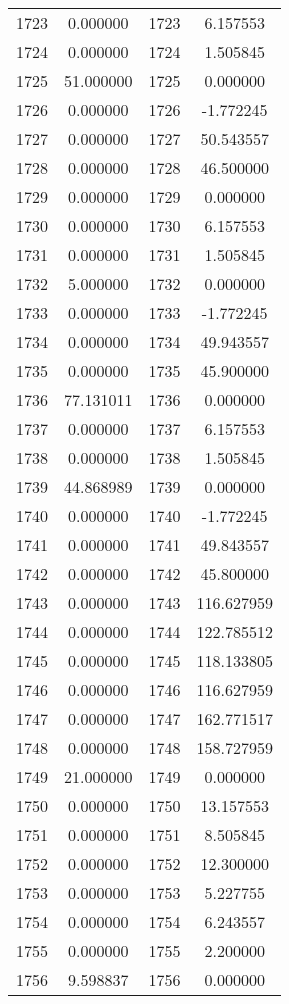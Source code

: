 \documentclass[12pt]{article}
\begin{document}
\begin{longtable}{@{}cccc@{}}
1723 & 0.000000 & 1723 & 6.157553 \\
1724 & 0.000000 & 1724 & 1.505845 \\
1725 & 51.000000 & 1725 & 0.000000 \\
1726 & 0.000000 & 1726 & -1.772245 \\
1727 & 0.000000 & 1727 & 50.543557 \\
1728 & 0.000000 & 1728 & 46.500000 \\
1729 & 0.000000 & 1729 & 0.000000 \\
1730 & 0.000000 & 1730 & 6.157553 \\
1731 & 0.000000 & 1731 & 1.505845 \\
1732 & 5.000000 & 1732 & 0.000000 \\
1733 & 0.000000 & 1733 & -1.772245 \\
1734 & 0.000000 & 1734 & 49.943557 \\
1735 & 0.000000 & 1735 & 45.900000 \\
1736 & 77.131011 & 1736 & 0.000000 \\
1737 & 0.000000 & 1737 & 6.157553 \\
1738 & 0.000000 & 1738 & 1.505845 \\
1739 & 44.868989 & 1739 & 0.000000 \\
1740 & 0.000000 & 1740 & -1.772245 \\
1741 & 0.000000 & 1741 & 49.843557 \\
1742 & 0.000000 & 1742 & 45.800000 \\
1743 & 0.000000 & 1743 & 116.627959 \\
1744 & 0.000000 & 1744 & 122.785512 \\
1745 & 0.000000 & 1745 & 118.133805 \\
1746 & 0.000000 & 1746 & 116.627959 \\
1747 & 0.000000 & 1747 & 162.771517 \\
1748 & 0.000000 & 1748 & 158.727959 \\
1749 & 21.000000 & 1749 & 0.000000 \\
1750 & 0.000000 & 1750 & 13.157553 \\
1751 & 0.000000 & 1751 & 8.505845 \\
1752 & 0.000000 & 1752 & 12.300000 \\
1753 & 0.000000 & 1753 & 5.227755 \\
1754 & 0.000000 & 1754 & 6.243557 \\
1755 & 0.000000 & 1755 & 2.200000 \\
1756 & 9.598837 & 1756 & 0.000000 \\

\end{longtable}
\end{document}
